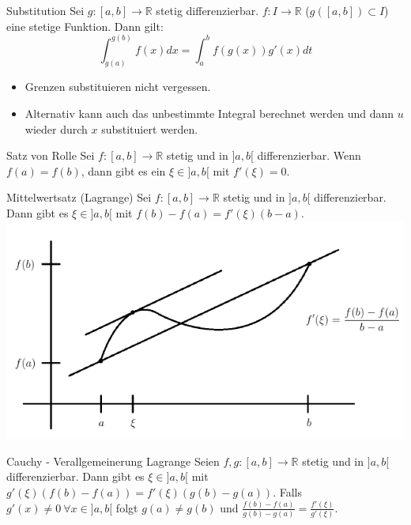 \documentclass[a4paper,10pt]{article}
\def\R{\mathbb{R}}
\begin{document}
\begin{mainbox}{Substitution}
  Sei $g: [a, b] \to \mathbb{R}$ stetig differenzierbar. $f: I \to \mathbb{R}$ ($g([a, b]) \subset I$) eine stetige Funktion. Dann gilt:
  $$\int_{g(a)}^{g(b)} f(x)dx = \int_{a}^{b} f(g(x))g'(x)dt$$
\end{mainbox}

\begin{itemize}
 \item Grenzen substituieren nicht vergessen.
 \item Alternativ kann auch das unbestimmte Integral berechnet werden und dann $u$ wieder durch $x$ substituiert werden.
\end{itemize}

\begin{subbox}{Satz von Rolle}
  Sei $f: [a,b] \to \R$ stetig und in $]a,b[$ differenzierbar. Wenn $f(a) = f(b)$, dann gibt es ein $\xi \in ]a,b[$ mit $f'(\xi) = 0$.
 \end{subbox}

\begin{mainbox}{Mittelwertsatz (Lagrange)}
  Sei $f: [a,b] \to \R$ stetig und in $]a,b[$ differenzierbar. Dann gibt es $\xi \in ]a,b[$ mit $f(b) - f(a) = f'(\xi)(b-a)$.
  \includegraphics[width=\linewidth]{mittelwertsatz.png}
 \end{mainbox}
 
 \begin{subbox}{Cauchy - Verallgemeinerung Lagrange}
   Seien $f, g: [a, b] \to \mathbb{R}$ stetig und in $]a, b[$ differenzierbar. Dann gibt es $\xi \in ]a, b[$ mit $g'(\xi)(f(b) - f(a)) = f'(\xi)(g(b) - g(a))$. Falls $g'(x) \neq 0 \ \forall x \in ]a, b[$ folgt $g(a) \neq g(b)$ und $\frac{f(b)-f(a)}{g(b)-g(a)} = \frac{f'(\xi)}{g'(\xi)}$.
 \end{subbox}
\end{document}
